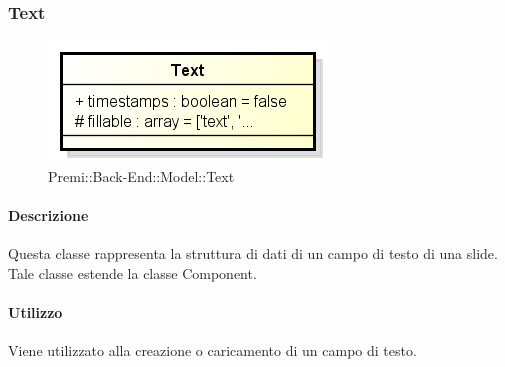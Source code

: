 \subsubsection{Text}

	\begin{figure}[h]
		\centering
		\includegraphics[width=0.5\linewidth]{img/back_end_premi_model_text}
		\caption[Premi::Back-End::Model::Text]{Premi::Back-End::Model::Text}
		\label{fig:back_end_premi_model_text}
	\end{figure}


	\paragraph{Descrizione}
	Questa classe rappresenta la struttura di dati di un campo di testo di una \gls{slide}. Tale classe estende la classe Component.
	
	\paragraph{Utilizzo}
	Viene utilizzato alla creazione o caricamento di un campo di testo.
	
